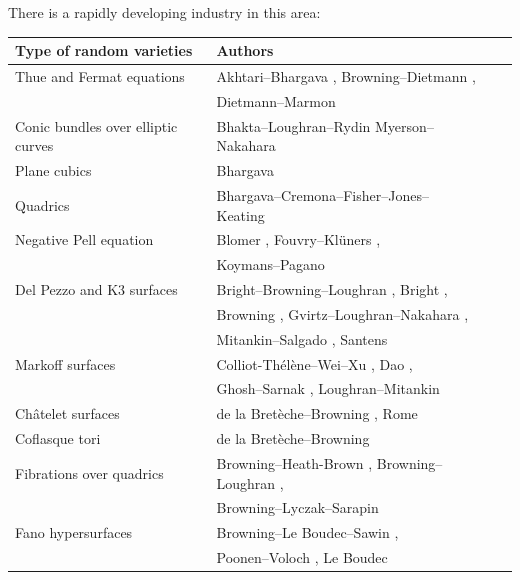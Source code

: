 \documentclass[a4paper,12pt,reqno]{amsart}
\numberwithin{equation}{section} \numberwithin{figure}{section}
\renewcommand{\#}{\sharp}
\theoremstyle{definition}
\numberwithin{lemma}{section}
\begin{document}
There is a  rapidly  developing industry 
in this area:
\begin{center}
    \begin{longtable}{| l | l | l | l |}
    \hline
   \textbf{Type of random varieties} &  \textbf{Authors}  \\ \hline
   Thue and Fermat equations &  Akhtari--Bhargava \cite{MR3928038},  Browning--Dietmann \cite {MR2537095}, 
\\ &  Dietmann--Marmon \cite{MR3312095} 
    \\ \hline 


Conic bundles over elliptic curves & Bhakta--Loughran--Rydin Myerson--Nakahara \cite{arXiv:2109.03746}
      \\ \hline 



Plane cubics & Bhargava \cite{Bha14}        \\ \hline 
   Quadrics & Bhargava--Cremona--Fisher--Jones--Keating \cite{MR3544620}       \\ \hline 
 

Negative Pell equation &  Blomer \cite{MR3642347},  Fouvry--Kl\"{u}ners \cite {MR2726105}, 
\\ &  Koymans--Pagano \cite{arXiv:2201.1342} \\ \hline 

Del Pezzo and K3 surfaces & Bright--Browning--Loughran \cite{MR3530447},  Bright \cite{MR3858417}, \\
 & Browning \cite{MR3731306}, Gvirtz--Loughran--Nakahara   \cite{MR3534973}, \\
 & Mitankin--Salgado \cite{MR4454468},  Santens \cite{arXiv:2201.04573}   \\ \hline 
{M}arkoff surfaces  &  Colliot-Th\'{e}l\`ene--Wei--Xu \cite{MR4288633}, Dao \cite{arXiv:2202.07142},
\\ &  Ghosh--Sarnak   \cite{MR4448994}, Loughran--Mitankin \cite{MR4320804}
    \\ \hline  
   {C}h\^{a}telet surfaces &  de la Bret\`eche--Browning \cite{MR3198755}, Rome \cite{MR3976470}    \\ \hline 

Coflasque tori &  de la Bret\`eche--Browning \cite{MR3232765}  \\ \hline 
Fibrations over quadrics & Browning--Heath-Brown \cite{BHB21}, Browning--Loughran   \cite{BL19}, 
\\
&  Browning--Lyczak--Sarapin \cite{arXiv:2203.06881} \\ \hline 
   Fano hypersurfaces &  Browning--Le Boudec--Sawin \cite {boudec},  
\\ &  Poonen--Voloch \cite{PV04}, Le Boudec \cite {MR4261096} 
\\ \hline 


\end{longtable}
\end{center}
\end{document}
